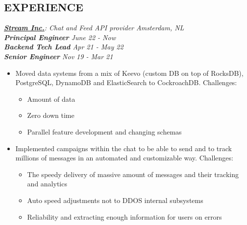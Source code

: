\documentclass[line, margin]{res}
\begin{document}
\address{\hspace{0.1cm}\href{mailto:elmas.ferhat@gmail.com}{elmas.ferhat@gmail.com}}
\address{\hspace{0.3cm}\href{https://github.com/ferhatelmas}{github.com/ferhatelmas}}

\begin{resume}

\vspace{-0.4cm}

\section{EXPERIENCE}

{\sl \textbf{\href{https://getstream.io}{Stream Inc.}}: Chat and Feed API provider \hfill Amsterdam, NL} \\
{\sl \textbf{Principal Engineer} \hfill June 22 - Now} \\
{\sl \textbf{Backend Tech Lead} \hfill Apr 21 - May 22} \\
{\sl \textbf{Senior Engineer} \hfill Nov 19 - Mar 21} \\

\vspace{-0.3cm}
\begin{itemize} \itemsep -5pt
	\item{Moved data systems from a mix of Keevo (custom DB on top of RocksDB), PostgreSQL, DynamoDB and ElasticSearch to CockroachDB. Challenges:}
		\begin{itemize} \itemsep -5pt \small
		\vspace{-.2cm}
		\item Amount of data
		\item Zero down time
		\item Parallel feature development and changing schemas
		\end{itemize}
		
	\item{Implemented campaigns within the chat to be able to send and to track millions of messages in an automated and customizable way. Challenges:}
		\begin{itemize} \itemsep -5pt \small
		\vspace{-.2cm}
		\item The speedy delivery of massive amount of messages and their tracking and analytics
		\item Auto speed adjustments not to DDOS internal subsystems
		\item Reliability and extracting enough information for users on errors
		\end{itemize}
		

\end{itemize}
\end{resume}
\end{document}
